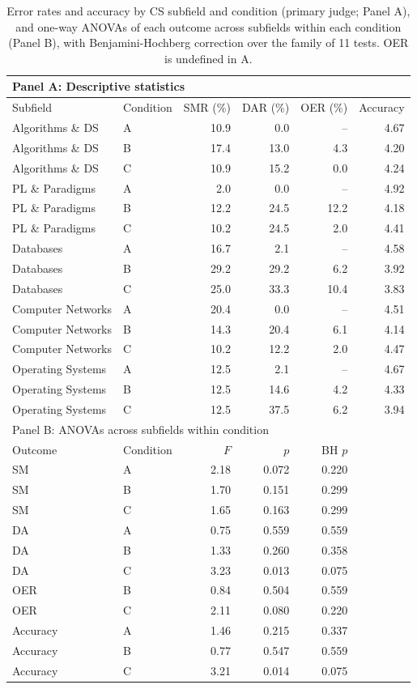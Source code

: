 \documentclass[journal,article,submit,pdftex,moreauthors]{Definitions/mdpi}
\begin{document}
\begin{table}[H]
\caption{Error rates and accuracy by CS subfield and condition (primary judge; Panel A), and one-way ANOVAs of each outcome across subfields within each condition (Panel B), with Benjamini-Hochberg correction over the family of 11 tests. OER is undefined in A.}
\label{tab:subfield}
\centering
\footnotesize
\setlength{\tabcolsep}{4pt}
\begin{tabular}{llrrrr}
\toprule
\multicolumn{6}{l}{Panel A: Descriptive statistics} \\
\midrule
Subfield & Condition & SMR (\%) & DAR (\%) & OER (\%) & Accuracy \\
\midrule
Algorithms \& DS & A & 10.9 & 0.0 & -- & 4.67 \\
Algorithms \& DS & B & 17.4 & 13.0 & 4.3 & 4.20 \\
Algorithms \& DS & C & 10.9 & 15.2 & 0.0 & 4.24 \\
PL \& Paradigms & A & 2.0 & 0.0 & -- & 4.92 \\
PL \& Paradigms & B & 12.2 & 24.5 & 12.2 & 4.18 \\
PL \& Paradigms & C & 10.2 & 24.5 & 2.0 & 4.41 \\
Databases & A & 16.7 & 2.1 & -- & 4.58 \\
Databases & B & 29.2 & 29.2 & 6.2 & 3.92 \\
Databases & C & 25.0 & 33.3 & 10.4 & 3.83 \\
Computer Networks & A & 20.4 & 0.0 & -- & 4.51 \\
Computer Networks & B & 14.3 & 20.4 & 6.1 & 4.14 \\
Computer Networks & C & 10.2 & 12.2 & 2.0 & 4.47 \\
Operating Systems & A & 12.5 & 2.1 & -- & 4.67 \\
Operating Systems & B & 12.5 & 14.6 & 4.2 & 4.33 \\
Operating Systems & C & 12.5 & 37.5 & 6.2 & 3.94 \\
\midrule
\multicolumn{6}{l}{Panel B: ANOVAs across subfields within condition} \\
\midrule
Outcome & Condition & $F$ & $p$ & BH $p$ & \\
\midrule
SM & A & 2.18 & 0.072 & 0.220 & \\
SM & B & 1.70 & 0.151 & 0.299 & \\
SM & C & 1.65 & 0.163 & 0.299 & \\
DA & A & 0.75 & 0.559 & 0.559 & \\
DA & B & 1.33 & 0.260 & 0.358 & \\
DA & C & 3.23 & 0.013 & 0.075 & \\
OER & B & 0.84 & 0.504 & 0.559 & \\
OER & C & 2.11 & 0.080 & 0.220 & \\
Accuracy & A & 1.46 & 0.215 & 0.337 & \\
Accuracy & B & 0.77 & 0.547 & 0.559 & \\
Accuracy & C & 3.21 & 0.014 & 0.075 & \\
\bottomrule
\end{tabular}
\end{table}
\end{document}
